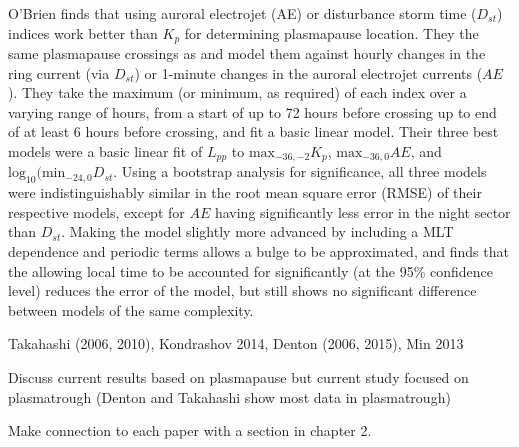 O'Brien \cite{OBrien2003EmpiricalPlasmapause} finds that using auroral electrojet (AE) or disturbance storm time ($D_{st}$) indices work better than $K_p$ for determining plasmapause location. They the same plasmapause crossings as \cite{Moldwin2002ModelPlasmapause} and model them against hourly changes in the ring current (via $D_{st}$) or 1-minute changes in the auroral electrojet currents ($AE$). They take the maximum (or minimum, as required) of each index over a varying range of hours, from a start of up to 72 hours before crossing up to end of at least 6 hours before crossing, and fit a basic linear model. Their three best models were a basic linear fit of $L_{pp}$ to $\text{max}_{-36,-2}K_p$, $\text{max}_{-36,0}AE$, and $\text{log}_{10}(\text{min}_{-24,0}D_{st}$. Using a bootstrap analysis for significance, all three models were indistinguishably similar in the root mean square error (RMSE) of their respective models, except for $AE$ having significantly less error in the night sector than $D_{st}$. Making the model slightly more advanced by including a MLT dependence and periodic terms allows a bulge to be approximated, and finds that the allowing local time to be accounted for significantly (at the 95\% confidence level) reduces the error of the model, but still shows no significant difference between models of the same complexity.

\vnote Takahashi (2006, 2010), Kondrashov 2014, Denton (2006, 2015), Min 2013

\vnote Discuss current results based on plasmapause but current study focused on plasmatrough (Denton and Takahashi show most data in plasmatrough)

\note Make connection to each paper with a section in chapter 2.

